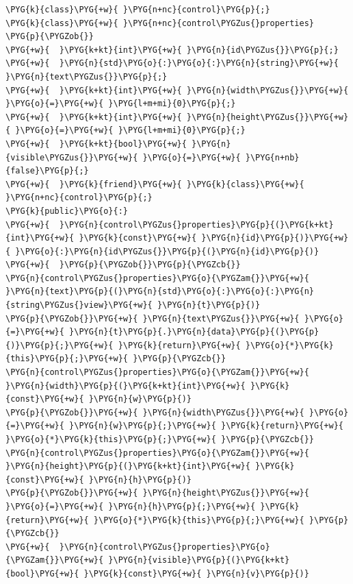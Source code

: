 \begin{codeblockbg}
\begin{Verbatim}[commandchars=\\\{\},breaklines=true,breakanywhere=true,fontsize=\codefont,xleftmargin=17bp]
\PYG{k}{class}\PYG{+w}{ }\PYG{n+nc}{control}\PYG{p}{;}
\PYG{k}{class}\PYG{+w}{ }\PYG{n+nc}{control\PYGZus{}properties}
\PYG{p}{\PYGZob{}}
\PYG{+w}{  }\PYG{k+kt}{int}\PYG{+w}{ }\PYG{n}{id\PYGZus{}}\PYG{p}{;}
\PYG{+w}{  }\PYG{n}{std}\PYG{o}{:}\PYG{o}{:}\PYG{n}{string}\PYG{+w}{ }\PYG{n}{text\PYGZus{}}\PYG{p}{;}
\PYG{+w}{  }\PYG{k+kt}{int}\PYG{+w}{ }\PYG{n}{width\PYGZus{}}\PYG{+w}{ }\PYG{o}{=}\PYG{+w}{ }\PYG{l+m+mi}{0}\PYG{p}{;}
\PYG{+w}{  }\PYG{k+kt}{int}\PYG{+w}{ }\PYG{n}{height\PYGZus{}}\PYG{+w}{ }\PYG{o}{=}\PYG{+w}{ }\PYG{l+m+mi}{0}\PYG{p}{;}
\PYG{+w}{  }\PYG{k+kt}{bool}\PYG{+w}{ }\PYG{n}{visible\PYGZus{}}\PYG{+w}{ }\PYG{o}{=}\PYG{+w}{ }\PYG{n+nb}{false}\PYG{p}{;}
\PYG{+w}{  }\PYG{k}{friend}\PYG{+w}{ }\PYG{k}{class}\PYG{+w}{ }\PYG{n+nc}{control}\PYG{p}{;}
\PYG{k}{public}\PYG{o}{:}
\PYG{+w}{  }\PYG{n}{control\PYGZus{}properties}\PYG{p}{(}\PYG{k+kt}{int}\PYG{+w}{ }\PYG{k}{const}\PYG{+w}{ }\PYG{n}{id}\PYG{p}{)}\PYG{+w}{ }\PYG{o}{:}\PYG{n}{id\PYGZus{}}\PYG{p}{(}\PYG{n}{id}\PYG{p}{)}
\PYG{+w}{  }\PYG{p}{\PYGZob{}}\PYG{p}{\PYGZcb{}}
\PYG{n}{control\PYGZus{}properties}\PYG{o}{\PYGZam{}}\PYG{+w}{ }\PYG{n}{text}\PYG{p}{(}\PYG{n}{std}\PYG{o}{:}\PYG{o}{:}\PYG{n}{string\PYGZus{}view}\PYG{+w}{ }\PYG{n}{t}\PYG{p}{)}
\PYG{p}{\PYGZob{}}\PYG{+w}{ }\PYG{n}{text\PYGZus{}}\PYG{+w}{ }\PYG{o}{=}\PYG{+w}{ }\PYG{n}{t}\PYG{p}{.}\PYG{n}{data}\PYG{p}{(}\PYG{p}{)}\PYG{p}{;}\PYG{+w}{ }\PYG{k}{return}\PYG{+w}{ }\PYG{o}{*}\PYG{k}{this}\PYG{p}{;}\PYG{+w}{ }\PYG{p}{\PYGZcb{}}
\PYG{n}{control\PYGZus{}properties}\PYG{o}{\PYGZam{}}\PYG{+w}{ }\PYG{n}{width}\PYG{p}{(}\PYG{k+kt}{int}\PYG{+w}{ }\PYG{k}{const}\PYG{+w}{ }\PYG{n}{w}\PYG{p}{)}
\PYG{p}{\PYGZob{}}\PYG{+w}{ }\PYG{n}{width\PYGZus{}}\PYG{+w}{ }\PYG{o}{=}\PYG{+w}{ }\PYG{n}{w}\PYG{p}{;}\PYG{+w}{ }\PYG{k}{return}\PYG{+w}{ }\PYG{o}{*}\PYG{k}{this}\PYG{p}{;}\PYG{+w}{ }\PYG{p}{\PYGZcb{}}
\PYG{n}{control\PYGZus{}properties}\PYG{o}{\PYGZam{}}\PYG{+w}{ }\PYG{n}{height}\PYG{p}{(}\PYG{k+kt}{int}\PYG{+w}{ }\PYG{k}{const}\PYG{+w}{ }\PYG{n}{h}\PYG{p}{)}
\PYG{p}{\PYGZob{}}\PYG{+w}{ }\PYG{n}{height\PYGZus{}}\PYG{+w}{ }\PYG{o}{=}\PYG{+w}{ }\PYG{n}{h}\PYG{p}{;}\PYG{+w}{ }\PYG{k}{return}\PYG{+w}{ }\PYG{o}{*}\PYG{k}{this}\PYG{p}{;}\PYG{+w}{ }\PYG{p}{\PYGZcb{}}
\PYG{+w}{  }\PYG{n}{control\PYGZus{}properties}\PYG{o}{\PYGZam{}}\PYG{+w}{ }\PYG{n}{visible}\PYG{p}{(}\PYG{k+kt}{bool}\PYG{+w}{ }\PYG{k}{const}\PYG{+w}{ }\PYG{n}{v}\PYG{p}{)}

\end{Verbatim}
\end{codeblockbg}
